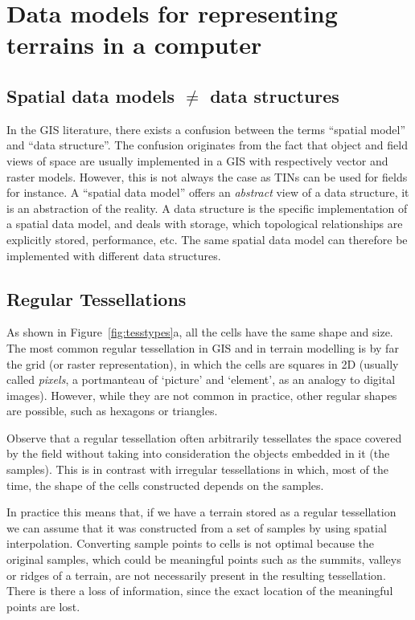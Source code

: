 %
\section{Data models for representing terrains in a computer}

\subsection{Spatial data models $\neq$ data structures}

In the GIS literature, there exists a confusion between the terms ``spatial model'' and ``data structure''. 
The confusion originates from the fact that object and field views of space are usually implemented in a GIS with respectively vector and raster models. 
However, this is not always the case as TINs can be used for fields for instance.
A ``spatial data model'' offers an \emph{abstract} view of a data structure, it is an abstraction of the reality.
A data structure is the specific implementation of a spatial data model, and deals with storage, which topological relationships are explicitly stored, performance, etc.
The same spatial data model can therefore be implemented with different data structures.



\subsection{Regular Tessellations} 

As shown in Figure~\ref{fig:tesstypes}a, all the cells have the same shape and size.
The most common regular tessellation in GIS and in terrain modelling is by far the grid (or raster representation), in which the cells are squares in 2D (usually called \emph{pixels}, a portmanteau of `picture' and `element', as an analogy to digital images).
However, while they are not common in practice, other regular shapes are possible, such as hexagons or triangles.

%

Observe that a regular tessellation often arbitrarily tessellates the space covered by the field without taking into consideration the objects embedded in it (the samples). 
This is in contrast with irregular tessellations in which, most of the time, the shape of the cells constructed depends on the samples.

In practice this means that, if we have a terrain stored as a regular tessellation we can assume that it was constructed from a set of samples by using spatial interpolation.
Converting sample points to cells is not optimal because the original samples, which could be meaningful points such as the summits, valleys or ridges of a terrain, are not necessarily present in the resulting tessellation. 
There is there a loss of information, since the exact location of the meaningful points are lost.

